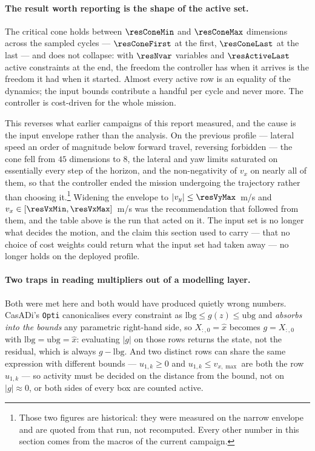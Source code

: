 \documentclass[11pt,a4paper]{article}
\begin{document}
\paragraph{The result worth reporting is the shape of the active set.} The critical cone holds between
$\resConeMin$ and $\resConeMax$ dimensions across the sampled cycles --- $\resConeFirst$ at the first,
$\resConeLast$ at the last --- and does not collapse: with $\resNvar$ variables and $\resActiveLast$ active
constraints at the end, the freedom the controller has when it arrives is the freedom it had when it
started. Almost every active row is an equality of the dynamics; the input bounds contribute a handful per
cycle and never more. The controller is cost-driven for the whole mission.

This reverses what earlier campaigns of this report measured, and the cause is the input envelope rather
than the analysis. On the previous profile --- lateral speed an order of magnitude below forward travel,
reversing forbidden --- the cone fell from $45$ dimensions to $8$, the lateral and yaw limits saturated on
essentially every step of the horizon, and the non-negativity of $v_x$ on nearly all of them, so that the
controller ended the mission undergoing the trajectory rather than choosing it.\footnote{Those two figures
are historical: they were measured on the narrow envelope and are quoted from that run, not recomputed.
Every other number in this section comes from the macros of the current campaign.} Widening the envelope to
$|v_y|\le\resVyMax$~m/s and $v_x\in[\resVxMin,\resVxMax]$~m/s was the recommendation that followed from
them, and the table above is the run that acted on it. The input set is no longer what decides the motion,
and the claim this section used to carry --- that no choice of cost weights could return what the input set
had taken away --- no longer holds on the deployed profile.

\paragraph{Two traps in reading multipliers out of a modelling layer.} Both were met here and both would have
produced quietly wrong numbers. CasADi's \texttt{Opti} canonicalises every constraint as
$\mathrm{lbg}\le g(z)\le\mathrm{ubg}$ and \emph{absorbs into the bounds} any parametric right-hand side, so
$X_{:,0}=\hat x$ becomes $g=X_{:,0}$ with $\mathrm{lbg}=\mathrm{ubg}=\hat x$: evaluating $|g|$ on those rows
returns the state, not the residual, which is always $g-\mathrm{lbg}$. And two distinct rows can share the
same expression with different bounds --- $u_{1,k}\ge0$ and $u_{1,k}\le v_{x,\max}$ are both the row
$u_{1,k}$ --- so activity must be decided on the distance from the bound, not on $|g|\approx0$, or both sides
of every box are counted active.
\end{document}
